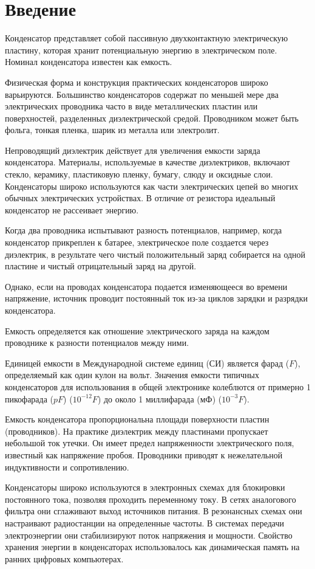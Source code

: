 \chapter{Введение}

Конденсатор представляет собой пассивную двухконтактную электрическую пластину, которая хранит потенциальную энергию в электрическом поле. Номинал конденсатора известен как емкость. 

Физическая форма и конструкция практических конденсаторов широко варьируются. Большинство конденсаторов содержат по меньшей мере два электрических проводника часто в виде металлических пластин или поверхностей, разделенных диэлектрической средой. Проводником может быть фольга, тонкая пленка, шарик из металла или электролит. 

Непроводящий диэлектрик действует для увеличения емкости заряда конденсатора. Материалы, используемые в качестве диэлектриков, включают стекло, керамику, пластиковую пленку, бумагу, слюду и оксидные слои. Конденсаторы широко используются как части электрических цепей во многих обычных электрических устройствах. В отличие от резистора идеальный конденсатор не рассеивает энергию.

Когда два проводника испытывают разность потенциалов, например, когда конденсатор прикреплен к батарее, электрическое поле создается через диэлектрик, в результате чего чистый положительный заряд собирается на одной пластине и чистый отрицательный заряд на другой. 

Однако, если на проводах конденсатора подается изменяющееся во времени напряжение, источник проводит постоянный ток из-за циклов зарядки и разрядки конденсатора.

Емкость определяется как отношение электрического заряда на каждом проводнике к разности потенциалов между ними. 

Единицей емкости в Международной системе единиц (СИ) является фарад ($F$), определяемый как один кулон на вольт. Значения емкости типичных конденсаторов для использования в общей электронике колеблются от примерно 1 пикофарада ($pF$) ($10^{-12} F$) до около 1 миллифарада (мФ) ($10^{-3} F$).

Емкость конденсатора пропорциональна площади поверхности пластин (проводников). На практике диэлектрик между пластинами пропускает небольшой ток утечки. Он имеет предел напряженности электрического поля, известный как напряжение пробоя. Проводники приводят к нежелательной индуктивности и сопротивлению.

Конденсаторы широко используются в электронных схемах для блокировки постоянного тока, позволяя проходить переменному току. В сетях аналогового фильтра они сглаживают выход источников питания. В резонансных схемах они настраивают радиостанции на определенные частоты. В системах передачи электроэнергии они стабилизируют поток напряжения и мощности. \cite{ERMUR} Свойство хранения энергии в конденсаторах использовалось как динамическая память на ранних цифровых компьютерах.

